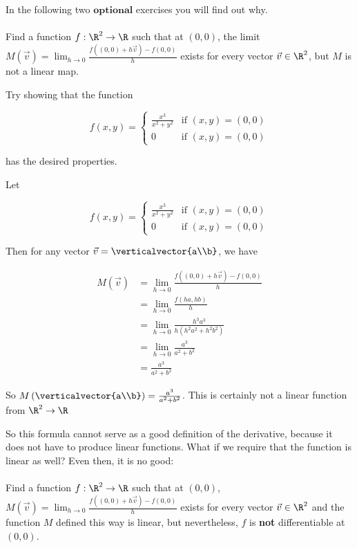 \documentclass{ximera}
\begin{document}
	In the following two $\textbf{optional}$ exercises you will find out why.
	\\
	\\
	Find a function $f:\R^2\to \R$ such that at $(0,0)$, the limit $M(\vec{v}) = \displaystyle\lim_{h \to 0}\frac{f((0,0)+h\vec{v}) - f(0,0)}{h}$ exists for every vector $\vec{v} \in \R^2$, but 
	$M$ is not a linear map.
	
	\begin{hint}
		Try showing that the function 
		
		\[f(x,y) = \begin{cases} 
			\frac{x^3}{x^2+y^2} & \text{if $(x,y) = (0,0)$} \\
			0 & \text{if $(x,y) = (0,0)$}
			\end{cases}\] 
			
			has the desired properties.
	\end{hint}
	\begin{free-response}
		Let 
		
		\[f(x,y) = \begin{cases} 
			\frac{x^3}{x^2+y^2} & \text{if $(x,y) = (0,0)$} \\
			0 & \text{if $(x,y) = (0,0)$}
			\end{cases}\] 
			
		Then for any vector $\vec{v} = \verticalvector{a\\b}$, we have 
		
		\begin{align*}
			M\left(\vec{v}\right) &= \lim_{h \to 0}\frac{f((0,0)+h\vec{v}) - f(0,0)}{h}\\
							&= \lim_{h \to 0}\frac{f(ha,hb)}{h}\\
							&=\lim_{h \to 0}\frac{h^3a^3}{h(h^2a^2+h^2b^2)}\\
							&=\lim_{h \to 0}\frac{a^3}{a^2+b^2}\\
							&=\frac{a^3}{a^2+b^2}
		\end{align*}
		
		So $M\left(\verticalvector{a\\b}\right) = \frac{a^3}{a^2+b^2}$.  This is certainly not a linear function from $\R^2 \to \R$
			
	\end{free-response}
	
	So this formula cannot serve as a good definition of the derivative, because it does not have to produce linear functions.  What if we require that the function is linear as well?
	Even then, it is no good:
	\\
	\\
	Find a function $f:\R^2 \to \R$ such that at $(0,0)$, $M(\vec{v}) = \lim_{h \to 0}\frac{f((0,0)+h\vec{v}) - f(0,0)}{h}$ exists for every vector $\vec{v} \in \R^2$ and 
	the function $M$ defined this way is linear, but nevertheless, $f$ is \textbf{not} differentiable at $(0,0)$.
	
\end{document}
